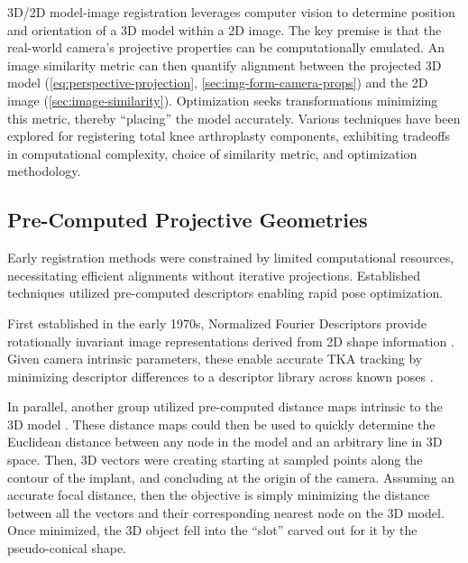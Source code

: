 3D/2D model-image registration leverages computer vision to determine position and orientation of a 3D model within a 2D image.
The key premise is that the real-world camera's projective properties can be computationally emulated.
An image similarity metric can then quantify alignment between the projected 3D model (\cref{eq:perspective-projection}, \cref{sec:img-form-camera-props}) and the 2D image (\cref{sec:image-similarity}).
Optimization seeks transformations minimizing this metric, thereby ``placing'' the model accurately.
Various techniques have been explored for registering total knee arthroplasty components, exhibiting tradeoffs in computational complexity, choice of similarity metric, and optimization methodology.

\subsection{Pre-Computed Projective Geometries}
Early registration methods were constrained by limited computational resources, necessitating efficient alignments without iterative projections.
Established techniques utilized pre-computed descriptors enabling rapid pose optimization.


First established in the early 1970s, Normalized Fourier Descriptors provide rotationally invariant image representations derived from 2D shape information \cite{wallaceAnalysisThreedimensionalMovement1980,richardIdentificationThreeDimensionalObjects1974,persoonShapeDiscriminationUsing1977,wallaceEfficientThreedimensionalAircraft1980}.
Given camera intrinsic parameters, these enable accurate TKA tracking by minimizing descriptor differences to a descriptor library across known poses \cite{banksModelBased3D1992,banksAccurateMeasurementThreedimensional1996}.

In parallel, another group utilized pre-computed distance maps intrinsic to the 3D model \cite{lavalleeRecoveringPositionOrientation1995,zuffiModelbasedMethodReconstruction1999}.
These distance maps could then be used to quickly determine the Euclidean distance between any node in the model and an arbitrary line in 3D space.
Then, 3D vectors were creating starting at sampled points along the contour of the implant, and concluding at the origin of the camera.
Assuming an accurate focal distance, then the objective is simply minimizing the distance between all the vectors and their corresponding nearest node on the 3D model.
Once minimized, the 3D object fell into the ``slot'' carved out for it by the pseudo-conical shape.


